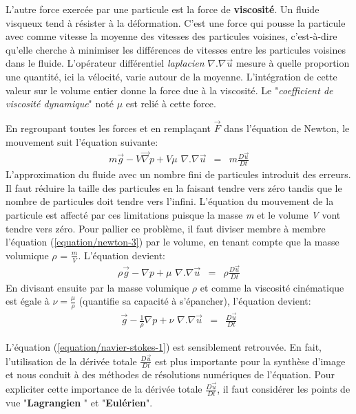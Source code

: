 \documentclass[11pt]{article}
\begin{document}
L'autre force exercée par une particule est la force de \textbf{viscosité}. Un fluide visqueux tend à résister à la déformation. C'est une force qui pousse la particule avec comme vitesse la moyenne des vitesses des particules voisines, c'est-à-dire qu'elle cherche à minimiser les différences de vitesses entre les particules voisines dans le fluide. L'opérateur différentiel \textit{laplacien} $ \nabla . \nabla \overrightarrow{u}$ mesure à quelle proportion une quantité, ici la vélocité, varie autour de la moyenne. L'intégration de cette valeur sur le volume entier donne la force due à la viscosité. Le "\textit{coefficient de viscosité dynamique}" noté $ \mu $ est relié à cette force.

En regroupant toutes les forces et en remplaçant $\overrightarrow{F}$ dans l'équation de Newton, le mouvement suit l'équation suivante:
	\begin{eqnarray}\label{equation/newton-3}
	m\overrightarrow{g} - V \overrightarrow{\nabla} p + V \mu \,\,\nabla\!.\!\nabla \overrightarrow{u} & = & m \frac{D \overrightarrow{u}}{Dt}
	\end{eqnarray}
L'approximation du fluide avec un nombre fini de particules introduit des erreurs. Il faut réduire la taille des particules en la faisant tendre vers zéro tandis que le nombre de particules doit tendre vers l'infini. L'équation du mouvement de la particule est affecté par ces limitations puisque la masse \textit{m} et le volume \textit{V} vont tendre vers zéro.
Pour pallier ce problème, il faut diviser membre à membre l'équation (\ref{equation/newton-3}) par le volume, en tenant compte que la masse volumique $ \rho $ = $ \frac{m}{V} $. L'équation devient:
	\begin{eqnarray}
	\rho\overrightarrow{g} - \nabla p + \mu \,\,\nabla\!.\!\nabla \overrightarrow{u} & = & \rho \frac{D \overrightarrow{u}}{Dt}
	\end{eqnarray}
En divisant ensuite par la masse volumique $ \rho $ et comme la viscosité cinématique est égale à $ \nu = \frac{\mu}{\rho} $ (quantifie sa capacité à s’épancher), l'équation devient:
	\begin{eqnarray}
	\overrightarrow{g} - \frac{1}{\rho}\nabla p + \nu \,\,\nabla\!.\!\nabla \overrightarrow{u} & = & \frac{D \overrightarrow{u}}{Dt}
	\end{eqnarray}

L'équation (\ref{equation/navier-stokes-1}) est sensiblement retrouvée. En fait, l'utilisation de la dérivée totale $ \frac{D\overrightarrow{u}}{Dt} $ est plus importante pour la synthèse d'image et nous conduit à des méthodes de résolutions numériques de l'équation. Pour expliciter cette importance de la dérivée totale $ \frac{D\overrightarrow{u}}{Dt} $, il faut considérer les points de vue "\textbf{Lagrangien} " et "\textbf{Eulérien}". 
\end{document}
